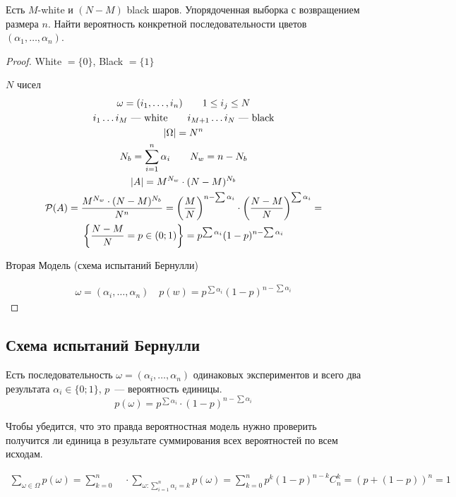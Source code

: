 \begin{problem}
    Есть $M$-white и $(N-M)$ black шаров. Упорядоченная выборка с возвращением размера $n$. Найти вероятность конкретной последовательности цветов $(\alpha_1,\ldots, \alpha_n)$.   
\end{problem}
\begin{proof}
White $= \{0\}$, Black $= \{1\}$
    
$N$ чисел 
\begin{gather*}
\omega = (i_1,\ldots, i_n) \qquad 1 \leq i_j \leq N\\
i_1 \ldots i_M \text{ --- white} \qquad
i_{M+1} \ldots i_N \text{ --- black} \\
|\Omega| = N^n\\
N_b = \sum_{i=1}^n \alpha_i \qquad N_w = n-N_b \\
|A| = M^{N_w} \cdot (N-M)^{N_b} \\
\mathcal{P}(A) = \frac{M^{N_w} \cdot (N-M)^{N_b}}{N^n} = 
\left( \frac{M}{N} \right)^{n - \sum \alpha_i} \cdot \left( \frac{N-M}{N}\right)^{\sum\alpha_i} = \\
\left\{\frac{N-M}{N}=p\in(0;1)\right\} =
p^{\sum\alpha_i}(1-p)^{n-\sum\alpha_i}
\end{gather*}

Вторая Модель (схема испытаний Бернулли) 

 \begin{gather*}
     \omega = (\alpha_i,\ldots,\alpha_n) \quad
     p(w) = p^{\sum\alpha_i}(1-p)^{n-\sum\alpha_i}
 \end{gather*}
\end{proof}

\subsection{Схема испытаний Бернулли}
Есть последовательность $\omega = (\alpha_i,\ldots,\alpha_n)$ одинаковых экспериментов и всего два результата $\alpha_i \in \{0;1\}$, $p$~--- вероятность единицы.
\[ p(\omega) = p^{\sum\alpha_i}\cdot(1-p)^{n-\sum\alpha_i} \]

Чтобы убедится, что это правда вероятностная модель нужно проверить получится ли единица в результате суммирования всех вероятностей по всем исходам.

\begin{gather*}
    \sum_{\omega\in\Omega}p(\omega)=
    \sum_{k=0}^n \quad \cdot \sum_{\omega:\sum_{i=1}^n\alpha_i=k} p(\omega) =
    \sum_{k=0}^np^k (1 - p)^{n-k} C_n^k = (p + (1 - p))^n = 1
\end{gather*}


